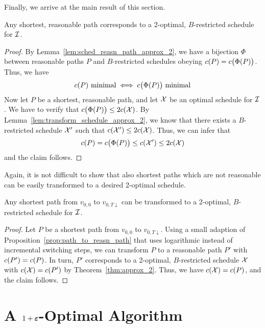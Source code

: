 Finally, we arrive at the main result of this section.
\begin{thm}\label{thm:approx_2}
Any shortest, reasonable path corresponds to a 2-optimal, $B$-restricted schedule for $\mathcal{I}$.
\end{thm} 
\begin{proof}
By Lemma~\ref{lem:sched_reasn_path_approx_2}, we have a bijection $\Phi$ between reasonable paths $P$ and $B$-restricted schedules obeying $c(P)=c\bigl(\Phi(P)\bigr)$. Thus, we have 
\begin{equation*}
	c(P)\text{ minimal}\iff c\bigl(\Phi(P)\big)\text{ minimal}
\end{equation*}
Now let $P$ be a shortest, reasonable path, and let $\mathcal{X}$ be an optimal schedule for $\mathcal{I}$. We have to verify that $c\bigl(\Phi(P)\bigr)\le 2c(\mathcal{X})$. By Lemma~\ref{lem:transform_schedule_approx_2}, we know that there exists a $B$-restricted schedule $\mathcal{X}'$ such that $c(\mathcal{X}')\le 2c(\mathcal{X})$. Thus, we can infer that
\begin{equation*}
	c(P)=c\bigl(\Phi(P)\bigr)\le c(\mathcal{X}')\le 2c(\mathcal{X})
\end{equation*}
and the claim follows.
\end{proof}
Again, it is not difficult to show that also shortest paths which are not reasonable can be easily transformed to a desired 2-optimal schedule.
\begin{cor}\label{cor:opt_sched_short_path_pseudo_lin}
Any shortest path from $v_{0,0}$ to $v_{0,T\downarrow}$ can be transformed to a 2-optimal, $B$-restricted schedule for $\mathcal{I}$.
\end{cor}
\begin{proof}
Let $P$ be a shortest path from $v_{0,0}$ to $v_{0,T\downarrow}$. Using a small adaption of Proposition~\ref{prop:path_to_reasn_path} that uses logarithmic instead of incremental switching steps, we can transform $P$ to a reasonable path $P'$ with $c(P')=c(P)$.
In turn, $P'$ corresponds to a 2-optimal, $B$-restricted schedule $\mathcal{X}$ with $c(\mathcal{X})=c(P')$ by Theorem~\ref{thm:approx_2}. Thus, we have $c(\mathcal{X})=c(P)$, and the claim follows.
\end{proof}


\section{A $1+\boldsymbol\varepsilon$-Optimal Algorithm}
